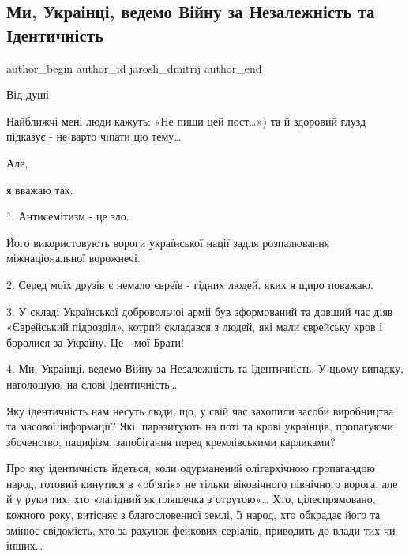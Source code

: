  
 
 
 
 
 
\subsection{Ми, Украінці, ведемо Війну за Незалежність та Ідентичність}
\label{sec:10_10_2021.fb.jarosh_dmitrij.1.ukraincy_vojna_nezalezhnist}
 
\ifcmt
 author_begin
   author_id jarosh_dmitrij
 author_end
\fi

Від душі

Найближчі мені люди кажуть: «Не пиши цей пост…») та й здоровий глузд підказує -
не варто чіпати цю тему…

Але, 

я вважаю так:

1. Антисемітизм - це зло.

Його використовують вороги української нації задля розпалювання міжнаціональної
ворожнечі.

2. Серед моїх друзів є немало євреїв - гідних людей, яких я щиро поважаю.

3. У складі Української добровольчоі арміі був зформований та довший час діяв
«Єврейський підрозділ», котрий складався з людей, які мали єврейську кров і
боролися за Україну. Це - мої Брати!

4. Ми, Украінці, ведемо Війну за Незалежність та Ідентичність. У цьому випадку,
наголошую, на слові Ідентичність…

Яку ідентичність нам несуть люди, що, у свій час захопили засоби виробництва та
масової інформації? Які, паразитують на поті та крові українців, пропагуючи
збоченство, пацифізм, запобігання перед кремлівськими карликами?

Про яку ідентичність йдеться, коли одурманений олігархічною пропагандою народ,
готовий кинутися в «об‘ятія» не тільки віковічного північного ворога, але й у
руки тих, хто «лагідний як пляшечка з отрутою»…  Хто, цілеспрямовано, кожного
року, витісняє з благословенної землі, її народ, хто обкрадає його та змінює
свідомість, хто за рахунок фейкових серіалів, приводить до влади тих чи інших…

